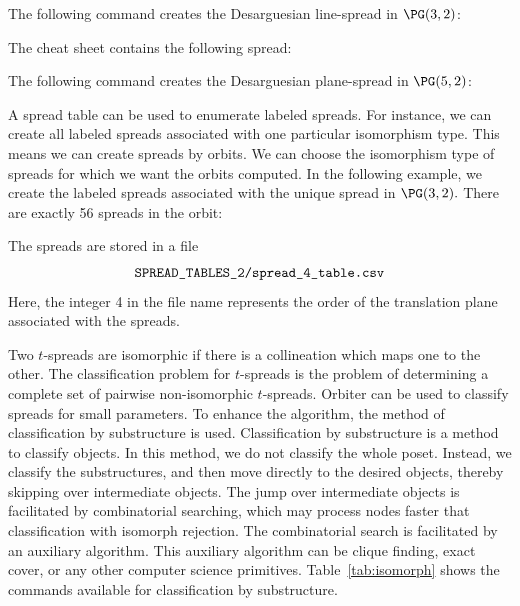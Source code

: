 



\bigskip


The following command creates the Desarguesian line-spread in $\PG(3,2)$: 


The cheat sheet contains the following spread:\\

\bigskip

The following command creates the Desarguesian plane-spread in $\PG(5,2)$:



\bigskip


A spread table can be used to enumerate labeled spreads. 
For instance, we can create all labeled spreads associated with one particular isomorphism type. 
This means we can create spreads by orbits. We can choose the isomorphism type of spreads for which we want the orbits computed. 
In the following example, we create the labeled spreads associated with the unique spread in $\PG(3,2).$ 
There are exactly 56 spreads in the orbit:


The spreads are stored in a file 
$$
\verb'SPREAD_TABLES_2/spread_4_table.csv'
$$
Here, the integer 4 in the file name represents the order of the translation plane associated with the spreads. 



\bigskip

Two $t$-spreads are isomorphic if there is a collineation which maps one to the other. 
The classification problem for $t$-spreads 
is the problem of determining a complete set of pairwise non-isomorphic 
$t$-spreads. 
Orbiter can be used to classify spreads for small parameters. 
To enhance the algorithm, 
the method of classification by substructure is used.
Classification by substructure is a method to classify objects.
In this method, we do not classify the whole poset. 
Instead, we classify the substructures, and then move directly to the 
desired objects, thereby skipping over intermediate objects.
The jump over intermediate objects is facilitated 
by combinatorial searching, 
which may process nodes faster that classification with isomorph rejection. 
The combinatorial search is facilitated by an auxiliary algorithm. 
This auxiliary algorithm can be clique finding, exact cover, or any other computer science primitives. 
Table~\ref{tab:isomorph} shows the commands available for classification by substructure.

